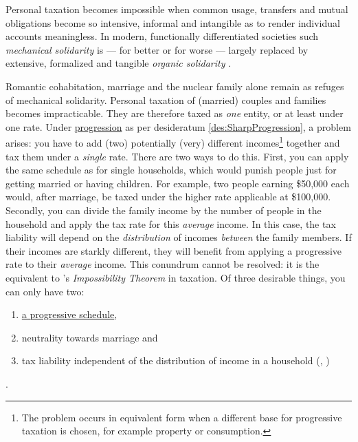 Personal taxation becomes impossible when common usage, transfers and mutual obligations become so intensive, informal and intangible as to render individual accounts meaningless.
In modern, functionally differentiated societies such \emph{mechanical solidarity} is --- for better or for worse --- largely replaced by extensive, formalized and tangible \emph{organic solidarity} \citep{Durkheim-1893-aa}.


Romantic cohabitation, marriage and the nuclear family alone remain as refuges of mechanical solidarity.
Personal taxation of (married) couples and families becomes impracticable.
They are therefore taxed as \emph{one} entity, or at least under one rate.
Under \href{des:SharpProgression}{progression} as per desideratum \ref{des:SharpProgression}, a problem arises:
you have to add (two) potentially (very) different incomes\footnote{The problem occurs in equivalent form when a different base for progressive taxation is chosen, for example property or consumption.} together and tax them under a \emph{single} rate.
There are two ways to do this.
First, you can apply the same schedule as for single households, which would punish people just for getting married or having children.
For example, two people earning \$50,000 each would, after marriage, be taxed under the higher rate applicable at \$100,000.
Secondly, you can divide the family income by the number of people in the household and apply the tax rate for this \emph{average} income.
In this case, the tax liability will depend on the \emph{distribution} of incomes \emph{between} the family members.
If their incomes are starkly different, they will benefit from applying a progressive rate to their \emph{average} income.
This conundrum cannot be resolved:
it is the equivalent to \citeauthor{Arrow1950}'s \emph{Impossibility Theorem} in taxation.
Of three desirable things, you can only have two:
\begin{enumerate}
	\item \href{des:SharpProgression}{a progressive schedule},
	\item neutrality towards marriage and
	\item tax liability independent of the distribution of income in a household (\citealt[124]{Moffitt2003}, \citealt[29]{Dalsgaard2005})
\end{enumerate}
.

